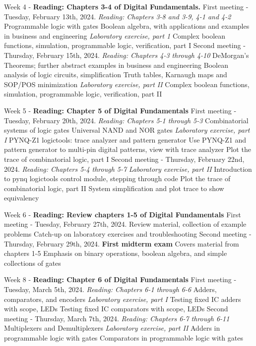 \documentclass[10pt]{article}
\begin{document}
\begin{outline}[enumerate]
\1 Week 4 - \textbf{Reading: Chapters 3-4 of Digital Fundamentals.}
\2 First meeting - Tuesday, February 13th, 2024. \textit{Reading: Chapters 3-8 and 3-9, 4-1 and 4-2}
\3 Programmable logic with gates
\3 Boolean algebra, with applications and examples in business and engineering
\3 \textit{Laboratory exercise, part 1}
\4 Complex boolean functions, simulation, programmable logic, verification, part I
\2 Second meeting - Thursday, February 15th, 2024.  \textit{Reading: Chapters 4-3 through 4-10}
\3 DeMorgan's Theorems; further abstract examples in business and engineering
\3 Boolean analysis of logic circuits, simplification
\3 Truth tables, Karnaugh maps and SOP/POS minimization
\3 \textit{Laboratory exercise, part II}
\4 Complex boolean functions, simulation, programmable logic, verification, part II

\1 Week 5 - \textbf{Reading: Chapter 5 of Digital Fundamentals}
\2 First meeting - Tuesday, February 20th, 2024. \textit{Reading:  Chapters 5-1 through 5-3}
\3 Combinatorial systems of logic gates
\3 Universal NAND and NOR gates
\3 \textit{Laboratory exercise, part I}
\4 PYNQ-Z1 logictools: trace analyzer and pattern generator
\4 Use PYNQ-Z1 and pattern generator to multi-pin digital patterns, view with trace analyzer
\4 Plot the trace of combinatorial logic, part I
\2 Second meeting - Thursday, February 22nd, 2024. \textit{Reading: Chapters 5-4 through 5-7}
\3 \textit{Laboratory exercise, part II}
\4 Introduction to pynq logictools control module, stepping through code
\4 Plot the trace of combinatorial logic, part II
\4 System simplification and plot trace to show equivalency

\1 Week 6 - \textbf{Reading: Review chapters 1-5 of Digital Fundamentals}
\2 First meeting - Tuesday, February 27th, 2024.
\3 Review material, collection of example problems
\3 Catch-up on laboratory exercises and troubleshooting
\2 Second meeting - Thursday, February 29th, 2024.
\3 \textbf{First midterm exam}
\4 Covers material from chapters 1-5
\4 Emphasis on binary operations, boolean algebra, and simple collections of gates

\1 Week 8 - \textbf{Reading: Chapter 6 of Digital Fundamentals}
\2 First meeting - Tuesday, March 5th, 2024. \textit{Reading: Chapters 6-1 through 6-6}
\3 Adders, comparators, and encoders
\3 \textit{Laboratory exercise, part I}
\4 Testing fixed IC adders with scope, LEDs
\4 Testing fixed IC comparators with scope, LEDs
\2 Second meeting - Thursday, March 7th, 2024. \textit{Reading: Chapters 6-7 through 6-11}
\3 Multiplexers and Demultiplexers
\3 \textit{Laboratory exercise, part II}
\4 Adders in programmable logic with gates
\4 Comparators in programmable logic with gates


\end{outline}
\end{document}

